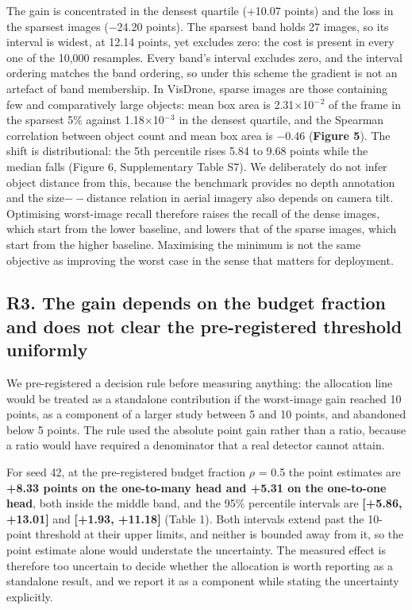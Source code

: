 \documentclass[sn-mathphys,Numbered]{sn-jnl}
\begin{document}
The gain is concentrated in the densest quartile (+10.07 points) and the loss in the sparsest images ($-$24.20 points). The sparsest band holds 27 images, so its interval is widest, at 12.14 points, yet excludes zero: the cost is present in every one of the 10,000 resamples. Every band's interval excludes zero, and the interval ordering matches the band ordering, so under this scheme the gradient is not an artefact of band membership. In VisDrone, sparse images are those containing few and comparatively large objects: mean box area is 2.31$\times$10$^-$$^2$ of the frame in the sparsest 5\% against 1.18$\times$10$^-$$^3$ in the densest quartile, and the Spearman correlation between object count and mean box area is $-$0.46 (\textbf{Figure 5}). The shift is distributional: the 5th percentile rises 5.84 to 9.68 points while the median falls (Figure 6, Supplementary Table S7). We deliberately do not infer object distance from this, because the benchmark provides no depth annotation and the size$--$distance relation in aerial imagery also depends on camera tilt. Optimising worst-image recall therefore raises the recall of the dense images, which start from the lower baseline, and lowers that of the sparse images, which start from the higher baseline. Maximising the minimum is not the same objective as improving the worst case in the sense that matters for deployment.

\subsection{R3. The gain depends on the budget fraction and does not clear the pre-registered threshold uniformly}

We pre-registered a decision rule before measuring anything: the allocation line would be treated as a standalone contribution if the worst-image gain reached 10 points, as a component of a larger study between 5 and 10 points, and abandoned below 5 points. The rule used the absolute point gain rather than a ratio, because a ratio would have required a denominator that a real detector cannot attain.

For seed 42, at the pre-registered budget fraction $\rho$ = 0.5 the point estimates are \textbf{+8.33 points on the one-to-many head and +5.31 on the one-to-one head}, both inside the middle band, and the 95\% percentile intervals are \textbf{[+5.86, +13.01]} and \textbf{[+1.93, +11.18]} (Table 1). Both intervals extend past the 10-point threshold at their upper limits, and neither is bounded away from it, so the point estimate alone would understate the uncertainty. The measured effect is therefore too uncertain to decide whether the allocation is worth reporting as a standalone result, and we report it as a component while stating the uncertainty explicitly.
\end{document}
